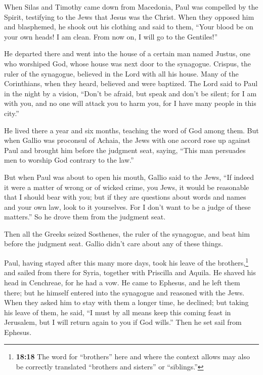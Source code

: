 \begin{paracol}{2}
\begin{otherlanguage}{english}
 When Silas and Timothy came down from Macedonia, Paul was
compelled by the Spirit, testifying to the Jews that Jesus was the
Christ.  When they opposed him and blasphemed, he shook
out his clothing and said to them, ``Your blood be on your own heads! I
am clean. From now on, I will go to the Gentiles!''

 He departed there and went into the house of a certain
man named Justus, one who worshiped God, whose house was next door to
the synagogue.  Crispus, the ruler of the synagogue,
believed in the Lord with all his house. Many of the Corinthians, when
they heard, believed and were baptized.  The Lord said to
Paul in the night by a vision, ``Don't be afraid, but speak and don't be
silent;  for I am with you, and no one will attack you to
harm you, for I have many people in this city.''

 He lived there a year and six months, teaching the word
of God among them.  But when Gallio was proconsul of
Achaia, the Jews with one accord rose up against Paul and brought him
before the judgment seat,  saying, ``This man persuades
men to worship God contrary to the law.''

 But when Paul was about to open his mouth, Gallio said
to the Jews, ``If indeed it were a matter of wrong or of wicked crime,
you Jews, it would be reasonable that I should bear with you;
 but if they are questions about words and names and your
own law, look to it yourselves. For I don't want to be a judge of these
matters.''  So he drove them from the judgment seat.

 Then all the Greeks seized Sosthenes, the ruler of the
synagogue, and beat him before the judgment seat. Gallio didn't care
about any of these things.

 Paul, having stayed after this many more days, took his
leave of the brothers,\footnote{\textbf{18:18} The word for ``brothers''
  here and where the context allows may also be correctly translated
  ``brothers and sisters'' or ``siblings.''} and sailed from there for
Syria, together with Priscilla and Aquila. He shaved his head in
Cenchreae, for he had a vow.  He came to Ephesus, and he
left them there; but he himself entered into the synagogue and reasoned
with the Jews.  When they asked him to stay with them a
longer time, he declined;  but taking his leave of them,
he said, ``I must by all means keep this coming feast in Jerusalem, but
I will return again to you if God wills.'' Then he set sail from
Ephesus.


\end{otherlanguage}
\end{paracol}
